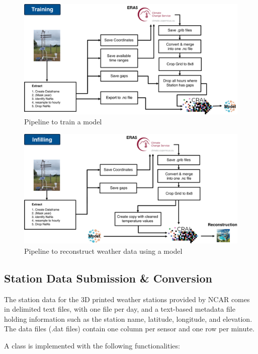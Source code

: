 \begin{figure}
    \centering
    \includegraphics[width=450pt]{resources/images/training_pipeline.png}
    \caption{Pipeline to train a model}
    \label{fig: training_pipeline}
\end{figure}

\begin{figure}
    \centering
    \includegraphics[width=450pt]{resources/images/infilling_pipeline.png}
    \caption{Pipeline to reconstruct weather data using a model}
    \label{fig: infilling_pipeline}
\end{figure}

\subsection{Station Data Submission \& Conversion}

The station data for the 3D printed weather stations provided by NCAR comes in delimited text files, with one file per day, and a text-based metadata file holding information such as the station name, latitude, longitude, and elevation. 
The data files (.dat files) contain one column per sensor and one row per minute.

A class  is implemented with the following functionalities:

